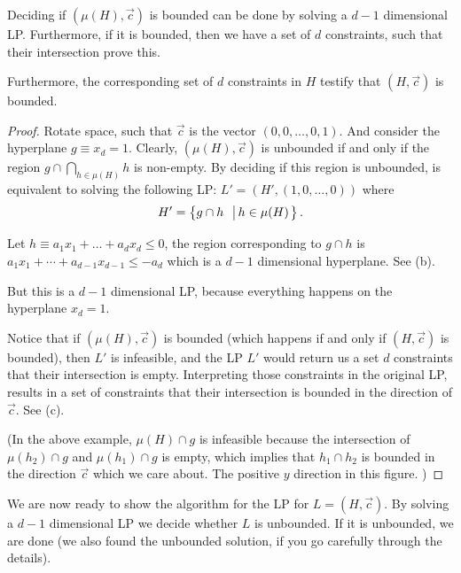 \begin{lemma}
Deciding if $(\mu(H),\overrightarrow{c})$ is bounded can be done
by solving a $d-1$ dimensional LP. Furthermore, if it is bounded,
then we have a set of $d$ constraints, such that their intersection
prove this. 

Furthermore, the corresponding set of $d$ constraints in $H$ testify
that $(H,\overrightarrow{c})$ is bounded.
\end{lemma}
\begin{proof}
    Rotate space, such that $\overrightarrow{c}$ is the vector
    $(0,0,\ldots,0,1)$.  And consider the hyperplane $g\equiv
    x_{d}=1$. Clearly, $(\mu(H),\overrightarrow{c})$ is unbounded if
    and only if the region $g\cap\bigcap_{h\in\mu(H)}h$ is non-empty.
    By deciding if this region is unbounded, is equivalent to solving
    the following LP: $L'=(H',(1,0,\ldots,0))$ where
    \[
    H'=\brc{g\cap h\ \sep{h\in\mu(H)}}.
    \]
    
    Let $h\equiv a_{1}x_{1}+\ldots+a_{d}x_{d}\leq0$, the region
    corresponding to $g\cap h$ is
    $a_{1}x_{1}+\cdots+a_{d-1}x_{d-1}\leq-a_{d}$ which is a $d-1$
    dimensional hyperplane. See  (b).   
    
    
    But this is a $d-1$ dimensional LP, because everything happens on
    the hyperplane $x_{d}=1$.
    
    Notice that if $(\mu(H),\overrightarrow{c})$ is bounded (which
    happens if and only if $(H,\overrightarrow{c})$ is bounded), then
    $L'$ is infeasible, and the LP $L'$ would return us a set $d$
    constraints that their intersection is empty. Interpreting those
    constraints in the original LP, results in a set of constraints
    that their intersection
    is bounded in the direction of $\overrightarrow{c}$. See
     (c).

    
    (In the above example, $\mu(H)\cap g$ is infeasible because the
    intersection of $\mu(h_{2})\cap g$ and $\mu(h_{1})\cap g$ is
    empty, which implies that $h_{1}\cap h_{2}$ is bounded in the
    direction $\overrightarrow{c}$ which we care about. The positive
    $y$ direction in this figure. )
\end{proof}




We are now ready to show the algorithm for the LP for
$L=(H,\overrightarrow{c}).$ By solving a $d-1$ dimensional LP we
decide whether $L$ is unbounded.  If it is unbounded, we are done (we
also found the unbounded solution,
if you go carefully through the details). 



